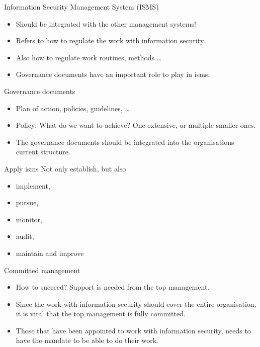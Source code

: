 \documentclass{beamer}
\begin{document}
\begin{frame}{Information Security Management System (ISMS)}
  \begin{itemize}
    \item Should be integrated with the other management systems!
    \item Refers to how to regulate the work with information security.
    \item Also how to regulate work routines, methods \dots
    \item Governance documents have an important role to play in \ac{isms}\@.
  \end{itemize}
\end{frame}

\begin{frame}{Governance documents}
  \begin{itemize}
    \item Plan of action, policies, guidelines, \dots
    \item Policy: What do we want to achieve?
      One extensive, or multiple smaller ones.
    \item The governance documents should be integrated into the organisations
      current structure.
  \end{itemize}
\end{frame}

\begin{frame}{Apply \ac{isms}}
  Not only establish, but also
  \begin{itemize}
    \item implement,
    \item pursue,
    \item monitor,
    \item audit,
    \item maintain and improve
  \end{itemize}
\end{frame}

\begin{frame}{Committed management}
  \begin{itemize}
    \item How to succeed?
      Support is needed from the top management.

    \item Since the work with information security should cover the entire
      organisation, it is vital that the top management is fully committed.

    \item Those that have been appointed to work with information security,
      needs to have the mandate to be able to do their work.

  \end{itemize}
\end{frame}
\end{document}
